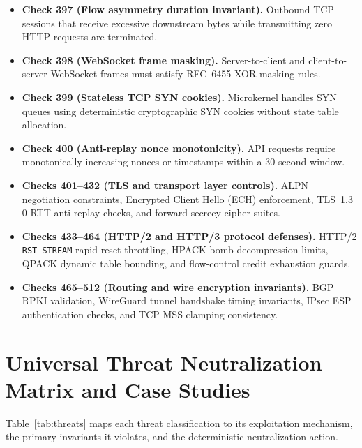 \documentclass{portalciencia}
\theoremstyle{plain}
\theoremstyle{definition}
\begin{document}
\begin{itemize}
  \item \textbf{Check 397 (Flow asymmetry duration invariant).} Outbound TCP sessions that receive excessive downstream bytes while transmitting zero HTTP requests are terminated.
  \item \textbf{Check 398 (WebSocket frame masking).} Server-to-client and client-to-server WebSocket frames must satisfy RFC~6455 XOR masking rules.
  \item \textbf{Check 399 (Stateless TCP SYN cookies).} Microkernel handles SYN queues using deterministic cryptographic SYN cookies without state table allocation.
  \item \textbf{Check 400 (Anti-replay nonce monotonicity).} API requests require monotonically increasing nonces or timestamps within a 30-second window.
  \item \textbf{Checks 401--432 (TLS and transport layer controls).} ALPN negotiation constraints, Encrypted Client Hello (ECH) enforcement, TLS~1.3 0-RTT anti-replay checks, and forward secrecy cipher suites.
  \item \textbf{Checks 433--464 (HTTP/2 and HTTP/3 protocol defenses).} HTTP/2 \texttt{RST\_STREAM} rapid reset throttling, HPACK bomb decompression limits, QPACK dynamic table bounding, and flow-control credit exhaustion guards.
  \item \textbf{Checks 465--512 (Routing and wire encryption invariants).} BGP RPKI validation, WireGuard tunnel handshake timing invariants, IPsec ESP authentication checks, and TCP MSS clamping consistency.
\end{itemize}

\section{Universal Threat Neutralization Matrix and Case Studies}

Table~\ref{tab:threats} maps each threat classification to its exploitation mechanism, the primary invariants it violates, and the deterministic neutralization action.
\end{document}
